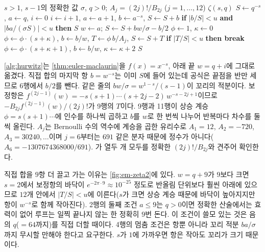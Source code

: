 \begin{algorithm}[htbp]
\begin{algorithmic}[1]
\Require $s>1$, $s-1$의 정확한 값 $\sigma$, $q>0$; $A_j=(2j)!/B_{2j}$ ($j=1,\dots,12$)
\Ensure $\zeta(s,q)$
\State $S\gets q^{-s}$, $a\gets q$, $i\gets0$
 
  \State $i\gets i+1$, $a\gets a+1$, $b\gets a^{-s}$, $S\gets S+b$
  \State \textbf{if} $|b/S|<u$ \textbf{and} $|ba/(\sigma S)|<u$ \textbf{then} \Return $S$ 
\EndWhile
\State $w\gets a$; $S\gets S+bw/\sigma-b/2$ 
\State $\phi\gets1$, $\kappa\gets0$
  \State $\phi\gets\phi\cdot(s+\kappa)$, $b\gets b/w$, $T\gets\phi\,b/A_j$, $S\gets S+T$ 
  \State \textbf{if} $|T/S|<u$ \textbf{then break}
  \State $\phi\gets\phi\cdot(s+\kappa+1)$, $b\gets b/w$, $\kappa\gets\kappa+2$
\EndFor
\State \Return $S$
\end{algorithmic}
\caption{Euler--Maclaurin으로 계산하는 Hurwitz 제타 (stardust , Cephes )}
\label{alg:hurwitz}
\end{algorithm}

\cref{alg:hurwitz}는 \cref{thm:euler-maclaurin}을 $f(x)=x^{-s}$, 아래 끝 $w=q+i$에 그대로 옮겼다. 직접 합의 마지막 항 $b=w^{-s}$는 이미 $S$에 들어 있는데 공식은 끝점을 반만 세므로 6행에서 $b/2$를 뺀다. 같은 줄의 $bw/\sigma=w^{1-s}/(s-1)$이 꼬리의 적분이다. 보정항은 $f^{(2j-1)}(w)=-s(s+1)\cdots(s+2j-2)\,w^{-s-2j+1}$이므로 $-B_{2j}f^{(2j-1)}(w)/(2j)!$가 9행의 $T$이다. 9행과 11행이 상승 계승 $\phi=s(s+1)\cdots$에 인수를 하나씩 곱하고 $b$를 $w$로 한 번씩 나누어 반복마다 차수를 둘씩 올린다. $A_j$는 Bernoulli 수의 역수에 계승을 곱한 유리수로 $A_1=12$, $A_2=-720$, $A_3=30240,\dots$이며 $j=6$부터는 $691$ 같은 분자 때문에 정수가 아니다($A_6=-1307674368000/691$). 가 열두 개 모두를 정확한 $(2j)!/B_{2j}$와 견주어 확인한다.

직접 합을 $9$항 더 끌고 가는 이유는 \cref{fig:em-zeta2}에 있다. $w=q+9$가 $9$보다 크면 $s=2$에서 보정항의 바닥이 $e^{-2\pi\cdot9}\approx10^{-25}$ 정도로 반올림 단위보다 훨씬 아래에 있으므로 $12$개 안에서 $|T/S|<u$에 이른다($s$가 크면 상승 계승 때문에 바닥이 높아지지만 항이 $w^{-s}$로 함께 작아진다). 2행의 둘째 조건 $a\le9$는 $q>0$이면 정확한 산술에서는 효력이 없어 루프는 일찍 끝나지 않는 한 정확히 $9$번 돈다. 이 조건이 쓸모 있는 것은 음의 $q$($=64$까지)를 직접 더할 때이다. 4행의 멈춤 조건은 항뿐 아니라 꼬리 적분 $ba/\sigma$까지 무시할 만해야 한다고 요구한다. $s$가 $1$에 가까우면 항은 작아도 꼬리가 크기 때문이다.

